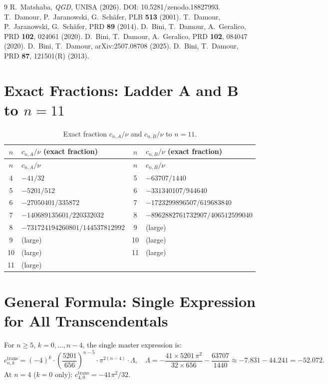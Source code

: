 \documentclass[11pt,a4paper]{article}
\theoremstyle{plain}
\theoremstyle{definition}
\theoremstyle{remark}
\begin{document}
\begin{thebibliography}{9}
R.~Matshaba, \textit{QGD}, UNISA (2026). DOI: 10.5281/zenodo.18827993.
T.~Damour, P.~Jaranowski, G.~Sch\"afer, PLB \textbf{513} (2001).
T.~Damour, P.~Jaranowski, G.~Sch\"afer, PRD \textbf{89} (2014).
D.~Bini, T.~Damour, A.~Geralico, PRD \textbf{102}, 024061 (2020).
D.~Bini, T.~Damour, A.~Geralico, PRD \textbf{102}, 084047 (2020).
D.~Bini, T.~Damour, arXiv:2507.08708 (2025).
D.~Bini, T.~Damour, PRD \textbf{87}, 121501(R) (2013).
\end{thebibliography}

\appendix
\section{Exact Fractions: Ladder A and B to $n=11$}
\label{app:fractions}

\renewcommand{\arraystretch}{1.2}\small
\begin{longtable}{@{}clcl@{}}
\caption{Exact fraction $c_{n,A}/\nu$ and $c_{n,B}/\nu$ to $n=11$.}\label{tab:exact_frac}\\
\toprule
$n$ & $c_{n,A}/\nu$ (exact fraction) & $n$ & $c_{n,B}/\nu$ (exact fraction) \\
\midrule
\endfirsthead
\toprule $n$ & $c_{n,A}/\nu$ & $n$ & $c_{n,B}/\nu$ \\ \midrule
\endhead
4 & $-41/32$ & 5 & $-63707/1440$ \\
5 & $-5201/512$ & 6 & $-331340107/944640$ \\
6 & $-27050401/335872$ & 7 & $-1723299896507/619683840$ \\
7 & $-140689135601/220332032$ & 8 & $-8962882761732907/406512599040$ \\
8 & $-731724194260801/144537812992$ & 9 & (large) \\
9 & (large) & 10 & (large) \\
10 & (large) & 11 & (large) \\
11 & (large) & & \\
\bottomrule
\end{longtable}

\section{General Formula: Single Expression for All Transcendentals}

For $n\geq5$, $k=0,\ldots,n-4$, the single master expression is:
\begin{equation}
  c_{n,k}^{\mathrm{trans}}
  = (-4)^k \cdot \left(\frac{5201}{656}\right)^{\!n-5}\!
    \cdot \pi^{2(n-4)} \cdot \Lambda,
  \quad
  \Lambda = -\frac{41\times5201\,\pi^2}{32\times656} - \frac{63707}{1440}
  \approx -7.831 - 44.241 = -52.072.
  \label{eq:master_cnk}
\end{equation}
At $n=4$ ($k=0$ only): $c_{4,0}^{\mathrm{trans}} = -41\pi^2/32$.
\end{document}
